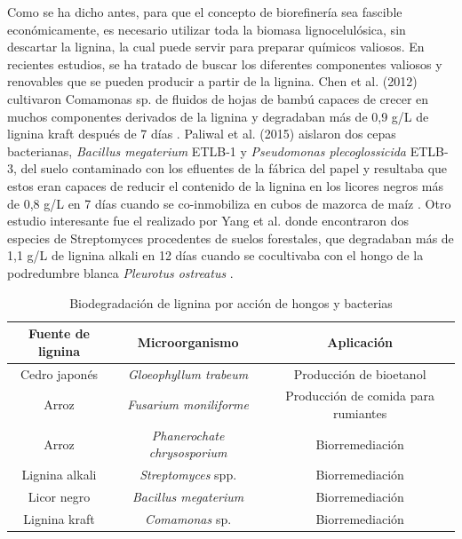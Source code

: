 \documentclass[final,a4paper,times,3p,onecolumn]{elsarticle}
\begin{document}
Como se ha dicho antes, para que el concepto de biorefinería sea fascible económicamente, es necesario utilizar toda la biomasa lignocelulósica, sin descartar la lignina, la cual puede servir para preparar químicos valiosos. En recientes estudios, se ha tratado de buscar los diferentes componentes valiosos y renovables que se pueden producir a partir de la lignina. Chen et al. (2012) cultivaron Comamonas sp. de fluidos de hojas de bambú capaces de crecer en muchos componentes derivados de la lignina y degradaban más de 0,9 g/L de lignina kraft después de 7 días \cite{Chen2012}. Paliwal et al. (2015) aislaron dos cepas bacterianas, \textit{Bacillus megaterium} ETLB-1 y \textit{Pseudomonas plecoglossicida} ETLB-3, del suelo contaminado con los efluentes de la fábrica del papel y resultaba que estos eran capaces de reducir el contenido de la lignina en los licores negros más de 0,8 g/L en 7 días cuando se co-inmobiliza en cubos de mazorca de maíz \cite{Paliwal2014}. Otro estudio interesante fue el realizado por Yang et al. donde encontraron dos especies de Streptomyces procedentes de suelos forestales, que degradaban más de 1,1 g/L de lignina alkali en 12 días cuando se cocultivaba con el hongo de la podredumbre blanca \textit{Pleurotus ostreatus} \cite{Yang2012}. 

\renewcommand{\listtablename}{Índice de tablas}
\renewcommand{\tablename}{Tabla}
\begin{table}[h]
	\centering
	\caption{Biodegradación de lignina por acción de hongos y bacterias}
	\label{tabla1}
	\begin{tabular}{|c|c|c|}
		\hline  \textbf{Fuente de lignina} & \textbf{Microorganismo} & \textbf{Aplicación} \\
		\hline  Cedro japonés &  \textit{Gloeophyllum trabeum} & Producción de bioetanol\\
		\hline  Arroz  &  \textit{Fusarium moniliforme} & Producción de comida para rumiantes \\
		\hline  Arroz  &  \textit{Phanerochate chrysosporium} &  Biorremediación\\
		\hline  Lignina alkali & \textit{Streptomyces} spp. & Biorremediación\\
		\hline  Licor negro & \textit{Bacillus megaterium} & Biorremediación\\
		\hline Lignina kraft & \textit{Comamonas} sp. & Biorremediación\\
		\hline
	\end{tabular}
	
\end{table}
\end{document}
